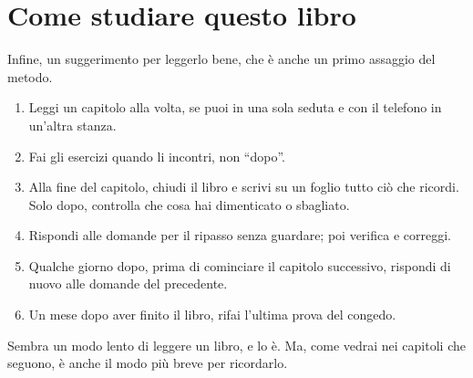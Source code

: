 \section*{Come studiare questo libro}

Infine, un suggerimento per leggerlo bene, che è anche un primo assaggio
del metodo.

\begin{inpratica}
\begin{enumerate}
  \item Leggi un capitolo alla volta, se puoi in una sola seduta e con
        il telefono in un'altra stanza.
  \item Fai gli esercizi quando li incontri, non \enquote{dopo}.
  \item Alla fine del capitolo, chiudi il libro e scrivi su un foglio
        tutto ciò che ricordi. Solo dopo, controlla che cosa hai
        dimenticato o sbagliato.
  \item Rispondi alle domande per il ripasso senza guardare; poi
        verifica e correggi.
  \item Qualche giorno dopo, prima di cominciare il capitolo
        successivo, rispondi di nuovo alle domande del precedente.
  \item Un mese dopo aver finito il libro, rifai l'ultima prova del
        congedo.
\end{enumerate}
\end{inpratica}

Sembra un modo lento di leggere un libro, e lo è. Ma, come vedrai nei
capitoli che seguono, è anche il modo più breve per ricordarlo.

\finecapitolo
